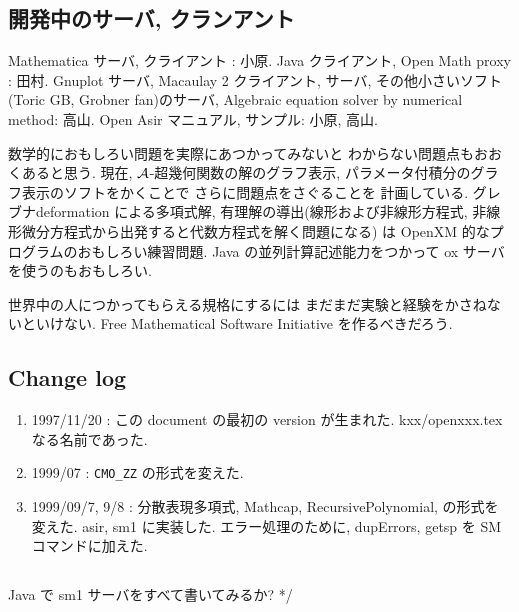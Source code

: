 \subsection{開発中のサーバ, クランアント}

Mathematica サーバ, クライアント : 小原.
Java クライアント, Open Math proxy : 田村.
Gnuplot サーバ, Macaulay 2 クライアント, サーバ,
その他小さいソフト (Toric GB, Grobner fan)のサーバ,
Algebraic equation solver by numerical method: 高山.
Open Asir マニュアル, サンプル: 小原, 高山.

数学的におもしろい問題を実際にあつかってみないと
わからない問題点もおおくあると思う.
現在, ${\cal A}$-超幾何関数の解のグラフ表示,
パラメータ付積分のグラフ表示のソフトをかくことで
さらに問題点をさぐることを
計画している.
グレブナdeformation による多項式解, 有理解の導出(線形および非線形方程式,
非線形微分方程式から出発すると代数方程式を解く問題になる)
は OpenXM 的なプログラムのおもしろい練習問題.
Java の並列計算記述能力をつかって ox サーバを使うのもおもしろい.

世界中の人につかってもらえる規格にするには
まだまだ実験と経験をかさねないといけない.
Free Mathematical Software Initiative を作るべきだろう.

\subsection{ Change log }
\begin{enumerate}
\item 1997/11/20 : この document の最初の version が生まれた.
  kxx/openxxx.tex なる名前であった.
\item 1999/07 : {\tt CMO\_ZZ} の形式を変えた.
\item 1999/09/7, 9/8 : 分散表現多項式, Mathcap, RecursivePolynomial,
の形式を変えた. asir, sm1 に実装した. エラー処理のために,
dupErrors, getsp を SM コマンドに加えた.
\end{enumerate}

\subsection{ }
Java で sm1 サーバをすべて書いてみるか?
*/
